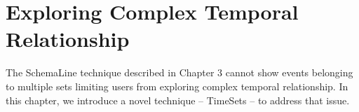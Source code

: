\chapter{Exploring Complex Temporal Relationship}
\label{chap:timesets}

\graphicspath{{Chapter4/figures/}}
The SchemaLine technique described in Chapter 3 cannot show events belonging to multiple sets limiting users from exploring complex temporal relationship. In this chapter, we introduce a novel technique -- TimeSets -- to address that issue. 


